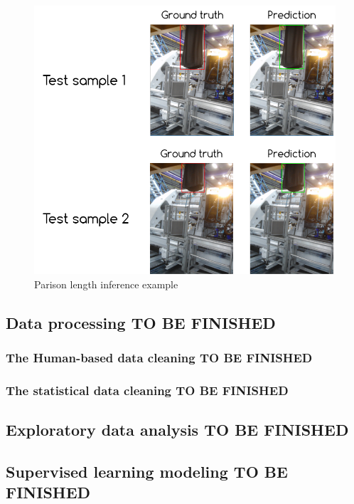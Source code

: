 \begin{figure}
\centerline{\includegraphics[scale=0.8]{images/chapter_3/parison_length_gt_prediction.png}}
\caption{Parison length inference example}
\label{fig:parison_inference}
\end{figure}

\subsection{Data processing TO BE FINISHED}

\subsubsection{The Human-based data cleaning TO BE FINISHED}

\subsubsection{The statistical data cleaning TO BE FINISHED}

\subsection{Exploratory data analysis TO BE FINISHED}



\subsection{Supervised learning modeling TO BE FINISHED}

